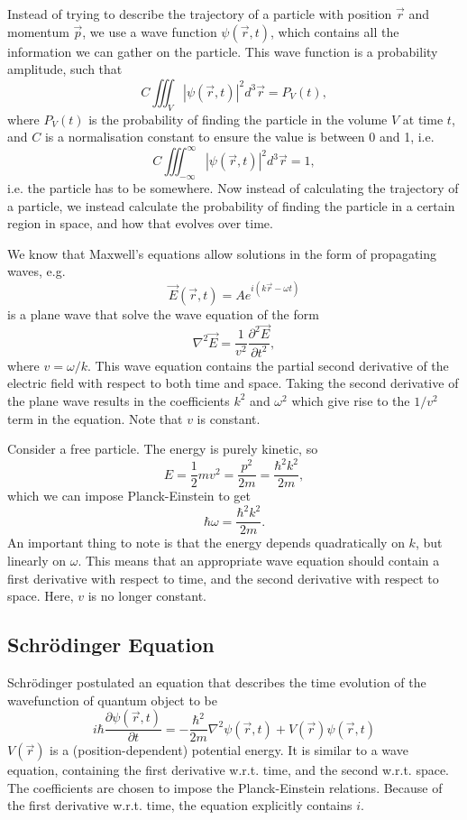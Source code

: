 \documentclass{article}
\begin{document}
Instead of trying to describe the trajectory of a particle with position $\vec{r}$ and momentum $\vec{p}$, we use a wave function $\psi (\vec{r},t)$, which contains all the information we can gather on the particle. This wave function is a probability amplitude, such that 
\[
C \iiint_V |\psi(\vec{r},t)|^2d^3\vec{r}=P_V(t),
\]
where $P_V(t)$ is the probability of finding the particle in the volume $V$ at time $t$, and $C$ is a normalisation constant to ensure the value is between 0 and 1, i.e.
\[
    C \iiint_{-\infty}^\infty|\psi (\vec{r},t)|^2d^3\vec{r}=1,
\]
i.e. the particle has to be somewhere. Now instead of calculating the trajectory of a particle, we instead calculate the probability of finding the particle in a certain region in space, and how that evolves over time.

We know that Maxwell's equations allow solutions in the form of propagating waves, e.g.
\[
    \vec{E}(\vec{r},t)=Ae^{i(k\vec{r}-\omega t)}
\]
is a plane wave that solve the wave equation of the form
\[
    \nabla^2\vec{E}=\frac{1}{v^2}\frac{\partial^2\vec{E}}{\partial t^2},
\]
where $v=\omega /k$. This wave equation contains the partial second derivative of the electric field with respect to both time and space. Taking the second derivative of the plane wave results in the coefficients $k^2$ and $\omega^2$ which give rise to the $1/v^2$ term in the equation. Note that $v$ is constant.

Consider a free particle. The energy is purely kinetic, so
\[
    E=\frac{1}{2}mv^2=\frac{p^2}{2m}=\frac{\hbar ^2k^2}{2m},
\]
which we can impose Planck-Einstein to get
\[
    \hbar \omega=\frac{\hbar^2k^2}{2m}.
\]
An important thing to note is that the energy depends quadratically on $k$, but linearly on $\omega $. This means that an appropriate wave equation should contain a first derivative with respect to time, and the second derivative with respect to space. Here, $v$ is no longer constant.

\subsection{Schr\"odinger Equation}
Schr\"odinger postulated an equation that describes the time evolution of the wavefunction of quantum object to be
\[
    \boxed{i\hbar \frac{\partial \psi (\vec{r},t)}{\partial t}=-\frac{\hbar^2}{2m}\nabla^2\psi (\vec{r},t)+V(\vec{r})\psi (\vec{r},t)}
\]
$V(\vec{r})$ is a (position-dependent) potential energy. It is similar to a wave equation, containing the first derivative w.r.t. time, and the second w.r.t. space. The coefficients are chosen to impose the Planck-Einstein relations. Because of the first derivative w.r.t. time, the equation explicitly contains $i$.
\end{document}
